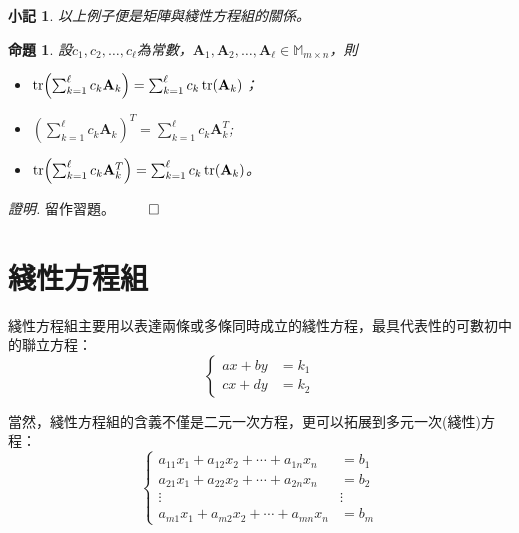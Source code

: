 \documentclass[12pt]{article}
\newtheorem*{proposition}{命題}
\newtheorem*{remark}{小記}
\renewenvironment*{proof}{\textit{證明.}}{\hfill$\qed$}
\begin{document}
    \begin{remark}
        以上例子便是矩陣與綫性方程組的關係。
    \end{remark}

    \begin{proposition}
        設$c_1,c_2,\dots,c_\ell$為常數，$\mathbf{A}_1,\mathbf{A}_2,\dots,\mathbf{A}_\ell\in\mathbb{M}_{m\times n}$，則\begin{itemize}
            \item $\tr(\sum_{k=1}^{\ell}c_k\mathbf{A}_k)=\sum_{k=1}^{\ell}c_k\tr(\mathbf{A}_k)$；
            \item $\left(\sum_{k=1}^{\ell}c_k\mathbf{A}_k\right)^T=\sum_{k=1}^{\ell}c_k\mathbf{A}_k^T$;
            \item $\tr(\sum_{k=1}^{\ell}c_k\mathbf{A}_k^T)=\sum_{k=1}^{\ell}c_k\tr(\mathbf{A}_k)$。
        \end{itemize}
    \end{proposition}
    
    \begin{proof}
        留作習題。
    \end{proof}
    
    \newpage

    \section*{綫性方程組}

    綫性方程組主要用以表達兩條或多條同時成立的綫性方程，最具代表性的可數初中的聯立方程：$$\begin{cases}
        ax+by&=k_1\\cx+dy&=k_2
    \end{cases}$$

    當然，綫性方程組的含義不僅是二元一次方程，更可以拓展到多元一次(綫性)方程：
    $$\begin{cases}
        a_{11}x_1+a_{12}x_2+\cdots+a_{1n}x_{n}&=b_1\\
        a_{21}x_1+a_{22}x_2+\cdots+a_{2n}x_{n}&=b_2\\
        \vdots&\vdots\\
        a_{m1}x_1+a_{m2}x_2+\cdots+a_{mn}x_{n}&=b_m
    \end{cases}$$
\end{document}
